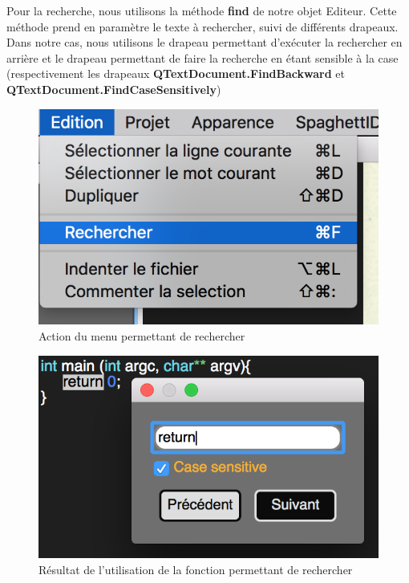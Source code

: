 \documentclass[a4paper,12pt]{article}
\begin{document}
	Pour la recherche, nous utilisons la méthode \textbf{find} de notre objet Editeur. Cette méthode prend en paramètre le texte à rechercher, suivi de différents drapeaux. Dans notre cas, nous utilisons le drapeau permettant d'exécuter la rechercher en arrière et le drapeau permettant de faire la recherche en étant sensible à la case (respectivement les drapeaux \textbf{QTextDocument.FindBackward} et \textbf{QTextDocument.FindCaseSensitively})

	\begin{figure}[h!]
		\begin{center}
			\includegraphics[scale=0.8]{images/imgs_edit/utilisation_rechercher}
			\caption{Action du menu permettant de rechercher}
		\end{center}
	\end{figure}

	\begin{figure}[h!]
		\begin{center}
			\includegraphics[scale=0.8]{images/imgs_edit/resultat_rechercher}
			\caption{Résultat de l'utilisation de la fonction permettant de rechercher}
		\end{center}
	\end{figure}
	\newpage
\end{document}

